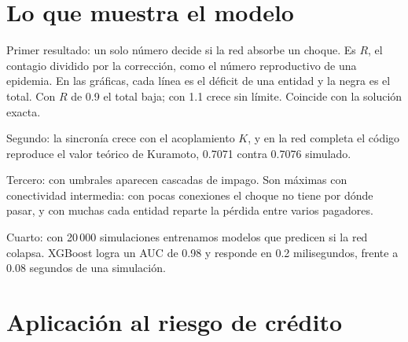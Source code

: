 \section{Lo que muestra el modelo}

\begin{decir}
Primer resultado: un solo número decide si la red absorbe un choque. Es $R$, el contagio
dividido por la corrección, como el número reproductivo de una epidemia. En las gráficas,
cada línea es el déficit de una entidad y la negra es el total. Con $R$ de 0.9 el total
baja; con 1.1 crece sin límite. Coincide con la solución exacta.
\end{decir}

\begin{decir}
Segundo: la sincronía crece con el acoplamiento $K$, y en la red completa el código
reproduce el valor teórico de Kuramoto, 0.7071 contra 0.7076 simulado.
\end{decir}

\begin{decir}
Tercero: con umbrales aparecen cascadas de impago. Son máximas con conectividad
intermedia: con pocas conexiones el choque no tiene por dónde pasar, y con muchas cada
entidad reparte la pérdida entre varios pagadores.
\end{decir}

\begin{decir}
Cuarto: con 20\,000 simulaciones entrenamos modelos que predicen si la red colapsa. XGBoost
logra un AUC de 0.98 y responde en 0.2 milisegundos, frente a 0.08 segundos de una
simulación.
\end{decir}

\section{Aplicación al riesgo de crédito}

